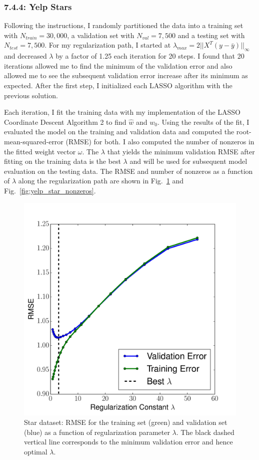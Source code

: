 \documentclass[12pt]{amsart}
\begin{document}
\subsubsection*{7.4.4: Yelp Stars}

Following the instructions, I randomly partitioned the data into a training set with $N_{train} = 30,000$, a validation set with $N_{val} = 7,500$ and a testing set with $N_{test} = 7,500$.  For my regularization path, I started at $\lambda_{max} = 2 ||X^{T}(y - \bar{y}) ||_{\infty}$ and decreased $\lambda$ by a factor of 1.25 each iteration for 20 steps.  I found that 20 iterations allowed me to find the minimum of the validation error and also allowed me to see the subsequent validation error increase after its minimum as expected.  After the first step, I initialized each LASSO algorithm with the previous solution.  

Each iteration, I fit the training data with my implementation of the LASSO Coordinate Descent Algorithm 2 to find $\hat{w}$ and $w_0$.  Using the results of the fit, I evaluated the model on the training and validation data and computed the root-mean-squared-error (RMSE) for both.  I also computed the number of nonzeros in the fitted weight vector $\omega$.  The $\lambda$ that yields the minimum validation RMSE after fitting on the training data is the best $\lambda$ and will be used for subsequent model evaluation on the testing data.  The RMSE and number of nonzeros as a function of $\lambda$ along the regularization path are shown in Fig.~\ref{fig:yelp_star_rmse} and Fig.~\ref{fig:yelp_star_nonzeros}.

\begin{figure}[H]
	\includegraphics[width=\columnwidth]{star_rmse.pdf}
    \caption{Star dataset: RMSE for the training set (green) and validation set (blue) as a function of regularization parameter $\lambda$.  The black dashed vertical line corresponds to the minimum validation error and hence optimal $\lambda$.}
    \label{fig:yelp_star_rmse}
\end{figure}
\end{document}
